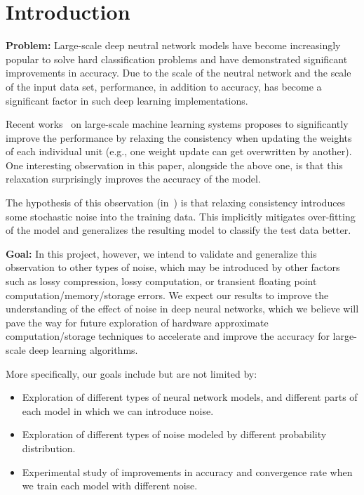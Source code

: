 \section{Introduction}
\label{sec:intro}


{\bf Problem:}
Large-scale deep neutral network models have become increasingly popular
to solve hard classification problems and have demonstrated significant
improvements in accuracy. Due to the scale of the neutral network and the
scale of the input data set, performance, in addition to accuracy, has
become a significant factor in such deep learning implementations.

Recent works~\cite{dean2012large, chilimbi14adam} on large-scale machine
learning systems proposes to significantly improve the performance by relaxing
the consistency when updating the weights of each individual unit (e.g., one
weight update can get overwritten by another). One interesting observation in
this paper, alongside the above one, is that this relaxation surprisingly
improves the accuracy of the model.

The hypothesis of this observation (in~\cite{chilimbi14adam}) is that relaxing
consistency introduces some stochastic noise into the training data. This
implicitly mitigates over-fitting of the model and generalizes the resulting
model to classify the test data better.

{\bf Goal:}
In this project, however, we intend to validate and generalize this observation
to other types of noise, which may be introduced by other factors such as lossy
compression, lossy computation, or transient floating point
computation/memory/storage errors. We expect our results to improve the
understanding of the effect of noise in deep neural networks, which we believe
will pave the way for future exploration of hardware approximate
computation/storage techniques to accelerate and improve the accuracy for
large-scale deep learning algorithms.

More specifically, our goals include but are not limited by:
\begin{itemize}
  \item Exploration of different types of neural network models, and different
    parts of each model in which we can introduce noise. 
  \item Exploration of different types of noise modeled by different probability
    distribution.
  \item Experimental study of improvements in accuracy and convergence rate when
    we train each model with different noise.
\end{itemize}

